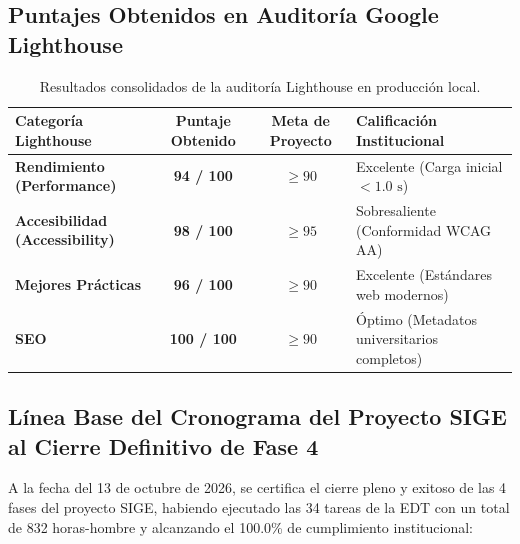 \documentclass[12pt,a4paper]{article}
\begin{document}
\subsection{Puntajes Obtenidos en Auditoría Google Lighthouse}
\begin{table}[H]
\centering
\small
\renewcommand{\arraystretch}{1.2}
\begin{tabularx}{\textwidth}{|>{\bfseries}m{3.8cm}|c|c|X|}
\hline
\rowcolor{tableheader}
\textbf{Categoría Lighthouse} & \textbf{Puntaje Obtenido} & \textbf{Meta de Proyecto} & \textbf{Calificación Institucional} \\
\hline
Rendimiento (Performance) & \textbf{94 / 100} & $\ge 90$ & Excelente (Carga inicial $<1.0\text{ s}$) \\
\hline
Accesibilidad (Accessibility) & \textbf{98 / 100} & $\ge 95$ & Sobresaliente (Conformidad WCAG AA) \\
\hline
Mejores Prácticas & \textbf{96 / 100} & $\ge 90$ & Excelente (Estándares web modernos) \\
\hline
SEO & \textbf{100 / 100} & $\ge 90$ & Óptimo (Metadatos universitarios completos) \\
\hline
\end{tabularx}
\caption{Resultados consolidados de la auditoría Lighthouse en producción local.}
\end{table}

\subsection{Línea Base del Cronograma del Proyecto SIGE al Cierre Definitivo de Fase 4}
A la fecha del 13 de octubre de 2026, se certifica el cierre pleno y exitoso de las 4 fases del proyecto SIGE, habiendo ejecutado las 34 tareas de la EDT con un total de 832 horas-hombre y alcanzando el 100.0\% de cumplimiento institucional:
\end{document}
